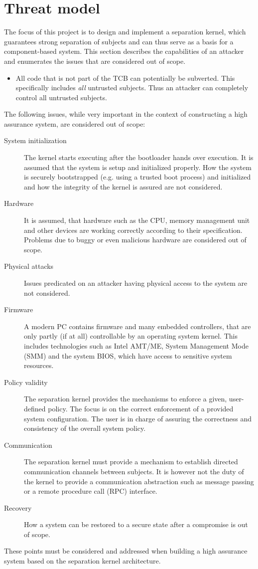 \section{Threat model}
The focus of this project is to design and implement a separation kernel, which
guarantees strong separation of subjects and can thus serve as a basis for a
component-based system. This section describes the capabilities of an attacker
and enumerates the issues that are considered out of scope.

\begin{itemize}
	\item All code that is not part of the TCB can potentially be subverted.
		This specifically includes \emph{all} untrusted subjects. Thus an
		attacker can completely control all untrusted subjects.
\end{itemize}

The following issues, while very important in the context of constructing a
high assurance system, are considered out of scope:

\begin{description}
	\item[System initialization] The kernel starts executing after the
		bootloader hands over execution. It is assumed that the system is setup
		and initialized properly. How the system is securely bootstrapped (e.g.
		using a trusted boot process) and initialized and how the integrity of
		the kernel is assured are not considered.
	\item[Hardware] It is assumed, that hardware such as the CPU, memory
		management unit and other devices are working correctly according to
		their specification. Problems due to buggy or even malicious hardware
		are considered out of scope.
	\item[Physical attacks] Issues predicated on an attacker having physical
		access to the system are not considered.
	\item[Firmware] A modern PC contains firmware and many embedded controllers,
		that are only partly (if at all) controllable by an operating system
		kernel. This includes technologies such as Intel AMT/ME, System
		Management Mode (SMM) and the system BIOS, which have access to
		sensitive system resources.
	\item[Policy validity] The separation kernel provides the mechanisms to
		enforce a given, user-defined policy. The focus is on the correct
		enforcement of a provided system configuration. The user is in charge of
		assuring the correctness and consistency of the overall system policy.
	\item[Communication] The separation kernel must provide a mechanism to
		establish directed communication channels between subjects.	It is
		however not the duty of the kernel to provide a	communication
		abstraction such as message passing or a remote procedure call (RPC)
		interface.
	\item[Recovery] How a system can be restored to a secure state after a
		compromise is out of scope.
\end{description}

These points must be considered and addressed when building a high assurance
system based on the separation kernel architecture.
